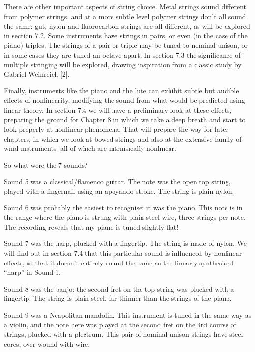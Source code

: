   There are other important aspects of string choice. Metal strings sound 
  different from polymer strings, and at a more subtle level polymer strings 
  don’t all sound the same: gut, nylon and fluorocarbon strings are all 
  different, as will be explored in section 7.2. Some instruments have strings 
  in pairs, or even (in the case of the piano) triples. The strings of a pair 
  or triple may be tuned to nominal unison, or in some cases they are tuned an 
  octave apart. In section 7.3 the significance of multiple stringing will be 
  explored, drawing inspiration from a classic study by Gabriel Weinreich [2]. 

  Finally, instruments like the piano and the lute can exhibit subtle but 
  audible effects of nonlinearity, modifying the sound from what would be 
  predicted using linear theory. In section 7.4 we will have a preliminary look 
  at these effects, preparing the ground for Chapter 8 in which we take a deep 
  breath and start to look properly at nonlinear phenomena. That will prepare 
  the way for later chapters, in which we look at bowed strings and also at the 
  extensive family of wind instruments, all of which are intrinsically 
  nonlinear. 

  So what were the 7 sounds? 

  Sound 5 was a classical/flamenco guitar. The note was the open top string, 
  played with a fingernail using an apoyando stroke. The string is plain nylon. 

  Sound 6 was probably the easiest to recognise: it was the piano. This note is 
  in the range where the piano is strung with plain steel wire, three strings 
  per note. The recording reveals that my piano is tuned slightly flat! 

  Sound 7 was the harp, plucked with a fingertip. The string is made of nylon. 
  We will find out in section 7.4 that this particular sound is influenced by 
  nonlinear effects, so that it doesn't entirely sound the same as the linearly 
  synthesised ``harp'' in Sound 1. 

  Sound 8 was the banjo: the second fret on the top string was plucked with a 
  fingertip. The string is plain steel, far thinner than the strings of the 
  piano. 

  Sound 9 was a Neapolitan mandolin. This instrument is tuned in the same way 
  as a violin, and the note here was played at the second fret on the 3rd 
  course of strings, plucked with a plectrum. This pair of nominal unison 
  strings have steel cores, over-wound with wire. 

